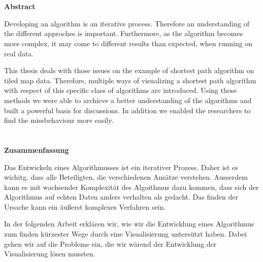 \chapter*{}
\thispagestyle{empty}

\begin{center}
    \large \textbf{Abstract}
\end{center}

Developing an algorithm is an iterative process.
Therefore an understanding of the different approches is important.
Furthermore, as the algorithm becomes more complex, it may come to different results than expected, when running on real data.

This thesis deals with those issues on the example of shortest path algorithm on tiled map data.
Therefore, multiple ways of visualizing a shortest path algorithm with respect of this specific class of algorithms are introduced.
Using those methods we were able to archieve a better understanding of the algorithms and built a powerful basis for discussions.
In addition we enabled the researchers to find the missbehaviour more easily.

\chapter*{}
\thispagestyle{empty}

\begin{center}
    \large \textbf{Zusammenfassung}
\end{center}

Das Entwickeln eines Algorithmusses ist ein iterativer Prozess.
Daher ist es wichitg, dass alle Beteiligten, die verschiedenen Ansätze verstehen.
Ausserdem kann es mit wachsender Komplexität des Algoithmus dazu kommen, dass sich der Algorithmus auf echten Daten anders verhalten als gedacht.
Das finden der Ursache kann ein äußerst komplexes Verfahren sein.

In der folgenden Arbeit erklären wir, wie wir die Entwicklung eines Algorithmus zum finden kürzester Wege durch eine Visualisierung untersützt haben.
Dabei gehen wir auf die Probleme ein, die wir wärend der Entwicklung der Visualisierung lösen mussten.
